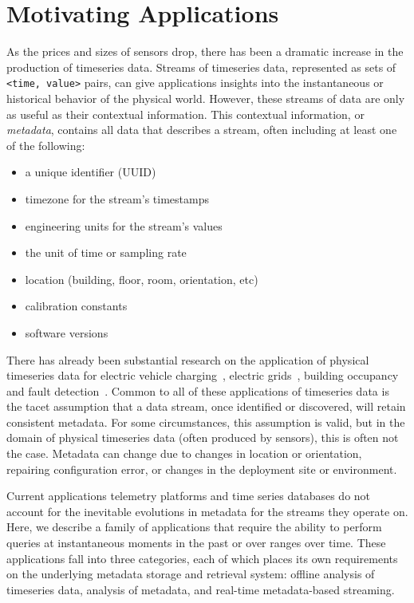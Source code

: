 \section{Motivating Applications}

As the prices and sizes of sensors drop, there has been a dramatic increase in
the production of timeseries data. Streams of timeseries data, represented as
sets of \texttt{<time, value>} pairs, can give applications insights into the
instantaneous or historical behavior of the physical world.  However, these
streams of data are only as useful as their contextual information.  This
contextual information, or \emph{metadata}, contains all data that describes a
stream, often including at least one of the following:

\begin{itemize}
\item a unique identifier (UUID)
\item timezone for the stream's timestamps
\item engineering units for the stream's values
\item the unit of time or sampling rate
\item location (building, floor, room, orientation, etc)
\item calibration constants
\item software versions
\end{itemize}

There has already been substantial research on the application of physical
timeseries data for electric vehicle charging~\cite{sortomme2011optimal},
electric grids~\cite{carreras2004evidence}, building
occupancy~\cite{richardson2008high} and fault
detection~\cite{fontugne2013strip}. Common to all of these applications of
timeseries data is the tacet assumption that a data stream, once identified or
discovered, will retain consistent metadata. For some circumstances, this
assumption is valid, but in the domain of physical timeseries data (often
produced by sensors), this is often not the case. Metadata can change due to
changes in location or orientation, repairing configuration error, or changes
in the deployment site or environment.

Current applications telemetry platforms and time series databases do not
account for the inevitable evolutions in metadata for the streams they operate
on. Here, we describe a family of applications that require the ability to
perform queries at instantaneous moments in the past or over ranges over time.
These applications fall into three categories, each of which places its
own requirements on the underlying metadata storage and retrieval system:
offline analysis of timeseries data, analysis of metadata, and real-time
metadata-based streaming.

